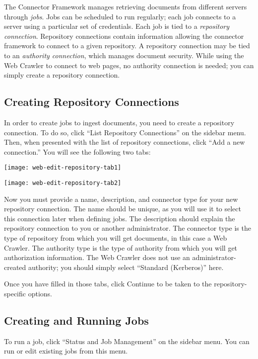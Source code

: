 \begin{changemargin}{1.5in}{0in}
The Connector Framework manages retrieving documents from different
servers through \emph{jobs}. Jobs can be scheduled to run
regularly; each job connects to a server using a particular
set of credentials. Each job is tied to a \emph{repository
connection}. Repository connections contain information allowing the
connector framework to connect to a given repository. A repository
connection may be tied to an \emph{authority connection}, which
manages document security. While using the Web Crawler to connect
to web pages, no authority connection is needed; you can simply
create a repository connection.


\subsection{Creating Repository Connections}

In order to create jobs to ingest documents, you need to create a
repository connection. To do so, click ``List Repository
Connections'' on the sidebar menu. Then, when presented with the list
of repository connections, click ``Add a new connection.'' You will
see the following two tabs:





\texttt{[image: web-edit-repository-tab1]}

\texttt{[image: web-edit-repository-tab2]}

Now you must provide a name, description, and connector type for your
new repository connection. The name should be unique, as you will use
it to select this connection later when defining jobs. The description
should explain the repository connection to you or another
administrator.  The connector type is the type of repository from
which you will get documents, in this case a Web Crawler. The
authority type is the type of authority from which you will get
authorization information. The Web Crawler does not use an
administrator-created authority; you should simply select ``Standard
(Kerberos)'' here.

Once you have filled in those tabs, click Continue to be taken to the
repository-specific options.



\subsection{Creating and Running Jobs}

To run a job, click ``Status and Job Management'' on the sidebar menu.
You can run or edit existing jobs from this menu.


\end{changemargin}

